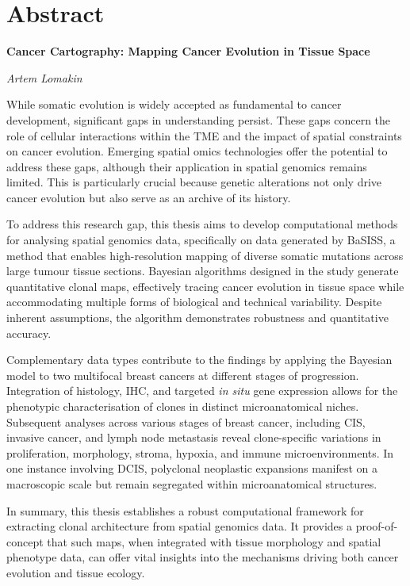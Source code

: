 \chapter*{Abstract}
\vspace*{-1cm}
{\large\textbf{Cancer Cartography: Mapping Cancer Evolution in Tissue Space}}

{\noindent\textit{Artem Lomakin}}

\vspace{0.25cm}

While somatic evolution is widely accepted as fundamental to cancer development, significant gaps in understanding persist. These gaps concern the role of cellular interactions within the \acf{TME} and the impact of spatial constraints on cancer evolution. Emerging spatial omics technologies offer the potential to address these gaps, although their application in spatial genomics remains limited. This is particularly crucial because genetic alterations not only drive cancer evolution but also serve as an archive of its history.

To address this research gap, this thesis aims to develop computational methods for analysing spatial genomics data, specifically on data generated by \acf{BaSISS}, a method that enables high-resolution mapping of diverse somatic mutations across large tumour tissue sections. Bayesian algorithms designed in the study generate quantitative clonal maps, effectively tracing cancer evolution in tissue space while accommodating multiple forms of biological and technical variability. Despite inherent assumptions, the algorithm demonstrates robustness and quantitative accuracy.

Complementary data types contribute to the findings by applying the Bayesian model to two multifocal breast cancers at different stages of progression. Integration of histology, \acf{IHC}, and targeted \textit{in situ} gene expression allows for the phenotypic characterisation of clones in distinct microanatomical niches. Subsequent analyses across various stages of breast cancer, including \acl{CIS}, invasive cancer, and lymph node metastasis reveal clone-specific variations in proliferation, morphology, stroma, hypoxia, and immune microenvironments. In one instance involving \acl{DCIS}, polyclonal neoplastic expansions manifest on a macroscopic scale but remain segregated within microanatomical structures. 

In summary, this thesis establishes a robust computational framework for extracting clonal architecture from spatial genomics data. It provides a proof-of-concept that such maps, when integrated with tissue morphology and spatial phenotype data, can offer vital insights into the mechanisms driving both cancer evolution and tissue ecology.



